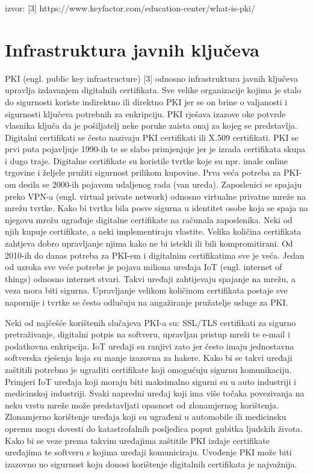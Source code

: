 \documentclass[]{foi}
\begin{document}
\cite{keyfactor-pki}
izvor: [3] https://www.keyfactor.com/education-center/what-is-pki/

\chapter{Infrastruktura javnih ključeva}

PKI (engl. public key infrastructure) [3] odnosno infrastruktura javnih ključeva upravlja izdavanjem digitalnih certifikata.
Sve velike organizacije kojima je stalo do sigurnosti koriste indirektno ili direktno PKI jer se on brine o valjanosti i sigurnosti ključeva potrebnih za enkripciju.
PKI rješava izazove oke potvrde vlasnika ključa da je pošiljatelj neke poruke zaista onaj za kojeg se predstavlja.
Digitalni certifikati se često nazivaju PKI certifikati ili X.509 certifikati.
PKI se prvi puta pojavljuje 1990-ih te se slabo primjenjuje jer je izrada certifikata skupa i dugo traje.
Digitalne certifikate su koristile tvrtke koje su npr. imale online trgovine i željele pružiti sigurnost prilikom kupovine.
Prva veća potreba za PKI-om desila se 2000-ih pojavom udaljenog rada (van ureda).
Zaposlenici se spajaju preko VPN-a (engl. virtual private network) odnosno virtualne privatne mreže na mrežu tvrtke.
Kako bi tvrtka bila posve sigurna u identitet osobe koja se spaja na njegovu mrežu ugrađuje digitalne certifikate na računala zaposlenika.
Neki od njih kupuje certifikate, a neki implementiraju vlastite.
Velika količina certifikata zahtjeva dobro upravljanje njima kako ne bi istekli ili bili kompromitirani.
Od 2010-ih do danas potreba za PKI-em i digitalnim certifikatima sve je veća.
Jedan od uzroka sve veće potrebe je pojava miliona uređaja IoT (engl. internet of things) odnosno internet stvari.
Takvi uređaji zahtijevaju spajanje na mrežu, a veza mora biti sigurna.
Upravljanje velikom količinom certifikata postaje sve napornije i tvrtke se često odlučuju na angažiranje pružatelje usluge za PKI.

Neki od najčešće korištenih slučajeva PKI-a su: SSL/TLS certifikati za sigurno pretraživanje, digitalni potpis na softveru, upravljan pristup mreži te e-mail i podatkovna enkripcija.
IoT uređaji su ranjivi zato jer često imaju jednostavna softverska rješenja koja su manje izazovna za hakere.
Kako bi se takvi uređaji zaštitili potrebno je ugraditi certifikate koji omogućuju sigurnu komunikaciju.
Primjeri IoT uređaja koji moraju biti maksimalno sigurni su u auto industriji i medicinskoj industriji.
Svaki napredni uređaj koji ima više točaka povezivanja na neku vrstu mreže može predstavljati opasnost od zlonamjernog korištenja.
Zlonamjerno korištenje uređaja koji su ugrađeni u automobile ili medicinsku opremu mogu dovesti do katastrofalnih posljedica poput gubitka ljudskih života.
Kako bi se veze prema takvim uređajima zaštitile PKI izdaje certifikate uređajima te softveru s kojima uređaji komuniciraju.
Uvođenje PKI može biti izazovno no sigurnost koju donosi korištenje digitalnih certifikata je najvažnija.
\end{document}
